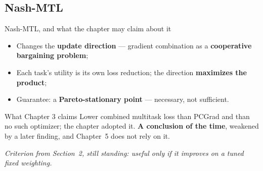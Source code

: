 \documentclass{beamer}
\begin{document}
\subsection{Nash-MTL}

\begin{frame}{Nash-MTL, and what the chapter may claim about it}
    \begin{itemize}
        \item Changes the \textbf{update direction} --- gradient combination as a
              \textbf{cooperative bargaining problem};
        \item Each task's utility is its own loss reduction; the direction
              \textbf{maximizes the product};
        \item Guarantee: a \textbf{Pareto-stationary point} --- necessary, not sufficient.
    \end{itemize}

    \bigskip
    \begin{alertblock}{What Chapter 3 claims}
        \small
        Lower combined multitask loss than PCGrad and than no such optimizer; the chapter adopted it.
        \textbf{A conclusion of the time}, weakened by a later finding,
        \alert{and Chapter~5 does not rely on it}.
    \end{alertblock}

    \medskip
    {\footnotesize\itshape Criterion from Section~2, still standing: useful only if it improves on a
    tuned fixed weighting.\par}
\end{frame}
\end{document}
